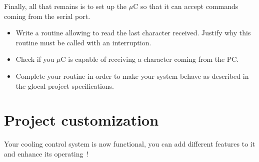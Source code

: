 \documentclass[11pt,a4paper]{article}
\theoremstyle{definition}%
\begin{document}

Finally, all that remains is to set up the $\mu$C so that it can accept commands coming from the serial port.
\begin{itemize}
	\item Write a routine allowing to read the last character received.
	Justify why this routine must be called with an interruption.
	\item Check if you $\mu$C is capable of receiving a character coming from the PC.
	\item Complete your routine in order to make your system behave as described in the glocal project specifications.
\end{itemize}









\section{Project customization}
Your cooling control system is now functional, you can add different features to it and enhance its operating~!
\end{document}
